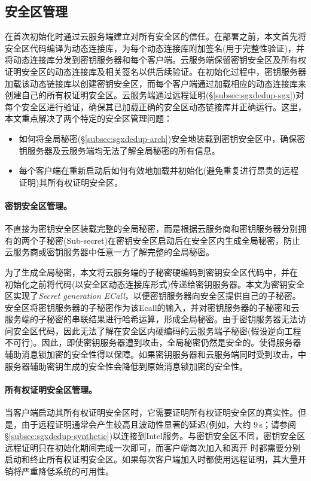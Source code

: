 \subsection{安全区管理}
\label{subsec:sgxdedup-enclave-management}

\sysnameS 在首次初始化时通过云服务端建立对所有安全区的信任。在\sysnameS 部署之前，本文首先将安全区代码编译为动态连接库\cite{sgx}，为每个动态连接库附加签名(用于完整性验证)，并将动态连接库分发到密钥服务器和每个客户端。云服务端保留密钥安全区及所有权证明安全区的动态连接库及相关签名以供后续验证。在初始化过程中，密钥服务器加载该动态链接库以创建密钥安全区，而每个客户端通过加载相应的动态连接库来创建自己的所有权证明安全区。云服务端通过远程证明(\S\ref{subsec:sgxdedup-sgx})对每个安全区进行验证，确保其已加载正确的安全区动态链接库并正确运行。这里，本文重点解决了两个特定的安全区管理问题：

\begin{itemize}[leftmargin=0em]
    \item 如何将全局秘密(\S\ref{subsec:sgxdedup-arch})安全地装载到密钥安全区中，确保密钥服务器及云服务端均无法了解全局秘密的所有信息。
    \item 每个客户端在重新启动后如何有效地加载并初始化(避免重复进行昂贵的远程证明)其所有权证明安全区。
\end{itemize}

\paragraph*{密钥安全区管理。}\sysnameS 不直接为密钥安全区装载完整的全局秘密，而是根据云服务商和密钥服务器分别拥有的两个子秘密(Sub-secret)在密钥安全区启动后在安全区内生成全局秘密，防止云服务商或密钥服务器中任意一方了解完整的全局秘密。

为了生成全局秘密，本文将云服务端的子秘密硬编码到密钥安全区代码中，并在 \sysnameS 初始化之前将代码(以安全区动态连接库形式)传递给密钥服务器。本文为密钥安全区实现了\textit{Secret generation ECall}，以便密钥服务器向安全区提供自己的子秘密。安全区将密钥服务器的子秘密作为该Ecall的输入，并对密钥服务器的子秘密和云服务端的子秘密的串联结果进行哈希运算，形成全局秘密。由于密钥服务器无法访问安全区代码，因此无法了解在安全区内硬编码的云服务端子秘密(假设逆向工程不可行)。因此，即使密钥服务器遭到攻击，全局秘密仍然是安全的。使得服务器辅助消息锁加密的安全性得以保障。如果密钥服务器和云服务端同时受到攻击，\sysnameS 中服务器辅助密钥生成的安全性会降低到原始消息锁加密的安全性。

\paragraph*{所有权证明安全区管理。} 当客户端启动其所有权证明安全区时，它​​需要证明所有权证明安全区的真实性。但是，由于远程证明通常会产生较高且波动性显著的延迟(例如，大约 9\,s；请参阅 \S\ref{subsec:sgxdedup-synthetic})以连接到Intel服务。与密钥安全区不同，密钥安全区远程证明只在初始化期间完成一次即可，而客户端每次加入和离开 \sysnameS 时都需要分别启动和终止所有权证明安全区。如果每次客户端加入时都使用远程证明，其大量开销将严重降低\sysnameS 系统的可用性。

